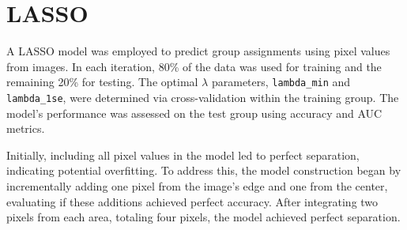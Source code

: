 \documentclass[12pt]{article}
\begin{document}



\section*{LASSO}

A LASSO model was employed to predict group assignments using pixel values from images. In each iteration, 80\% of the data was used for training and the remaining 20\% for testing. The optimal \(\lambda\) parameters, \texttt{lambda\_min} and \texttt{lambda\_1se}, were determined via cross-validation within the training group. The model's performance was assessed on the test group using accuracy and AUC metrics.

Initially, including all pixel values in the model led to perfect separation, indicating potential overfitting. To address this, the model construction began by incrementally adding one pixel from the image's edge and one from the center, evaluating if these additions achieved perfect accuracy. After integrating two pixels from each area, totaling four pixels, the model achieved perfect separation.
\end{document}
